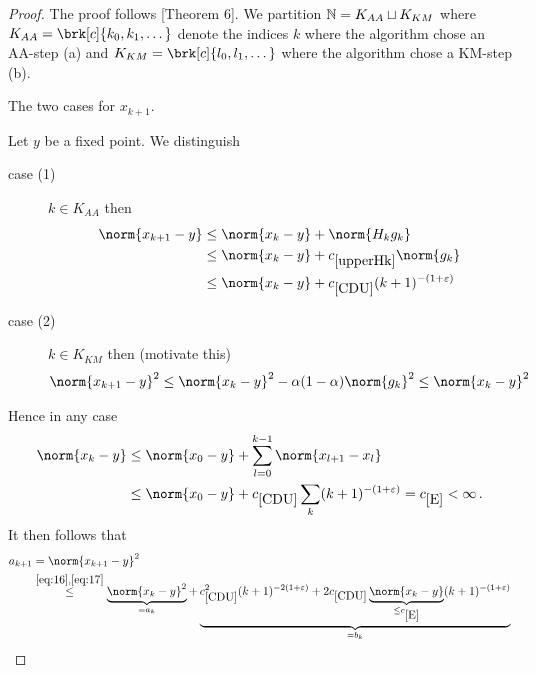 \begin{proof}
	The proof follows \cite{ZhaAA}[Theorem 6].
	We partition $\mathbb{N}=K_{AA}\sqcup K_{KM}$ where $K_{AA}=\brk[c]{k_0,k_1,\dots}$ denote the indices $k$ where the algorithm chose an AA-step (a) and $K_{KM}=\brk[c]{l_0,l_1,\dots}$ where the algorithm chose a KM-step (b).
	
	\begin{center}
	\DontPrintSemicolon
	\begin{algorithm}[H]
	\caption{The two cases for $x_{k+1}$.}
	\end{algorithm}
	\end{center}
	Let $y$ be a fixed point. We distinguish
	\begin{description}
		\item[case (1)]
		$k\in K_{AA}$ then
		\begin{equation}
		\begin{aligned}
			\norm{x_{k+1}-y}&\leq \norm{x_k-y}+\norm{H_kg_k} \\
			&\leq \norm{x_k-y}+\useconstant{upperHk}\norm{g_k} \\
			&\leq \norm{x_k-y}+\useconstant{CDU}(k+1)^{-(1+\e)}
			\label{eq:16}
		\end{aligned}
		\end{equation}
		\item[case (2)]
		$k\in K_{KM}$ then (motivate this)
		\begin{align}
			\norm{x_{k+1}-y}^2\leq \norm{x_k-y}^2-\alpha(1-\alpha)\norm{g_k}^2\leq \norm{x_k-y}^2
			\label{eq:17}
		\end{align}
	\end{description}
	Hence in any case
	\begin{align*}
		\norm{x_k-y}
		&\leq \norm{x_0-y}+\sum_{l=0}^{k-1}\norm{x_{l+1}-x_l} \\
		&\leq \norm{x_0-y}+\useconstant{CDU}\sum_k(k+1)^{-(1+\e)}
		= \useconstant{E}<\infty\,.
	\end{align*}
	It then follows that
	\begin{equation}
	\begin{aligned}
		a_{k+1} &= \norm{x_{k+1}-y}^2 \\
		&\stackrel{\eqref{eq:16}, \eqref{eq:17}}{\leq} \underbrace{\norm{x_k-y}^2}_{=a_k}+\underbrace{\useconstant{CDU}^2(k+1)^{-2(1+\e)}+2\useconstant{CDU}\underbrace{\norm{x_k-y}}_{\leq \useconstant{E}}(k+1)^{-(1+\e)}}_{=b_k} \\

\end{aligned}
\end{equation}
\end{proof}
